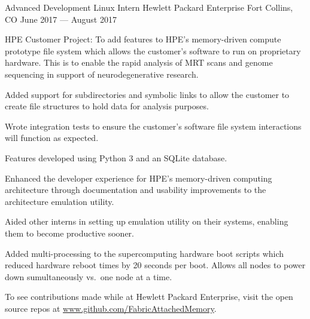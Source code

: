 

\begin{cventries}

  \cventry
    {Advanced Development Linux Intern} %
    {Hewlett Packard Enterprise} %
    {Fort Collins, CO} %
    {June 2017 --- August 2017} %
    {
      \begin{cvitems} %
        \item {HPE Customer Project:  To add features to HPE’s memory-driven compute prototype file system which allows the customer’s software to run on proprietary hardware. This is to enable the rapid analysis of MRT scans and genome sequencing in support of neurodegenerative research.}
        \item {Added support for subdirectories and symbolic links to allow the customer to create file structures to hold data for analysis purposes.}
        \item {Wrote integration tests to ensure the customer's software file system interactions will function as expected.}
        \item {Features developed using Python 3 and an SQLite database.}
        \item {Enhanced the developer experience for HPE's memory-driven computing architecture through documentation and usability improvements to the architecture emulation utility.}
        \item {Aided other interns in setting up emulation utility on their systems, enabling them to become productive sooner.}
        \item {Added multi-processing to the supercomputing hardware boot scripts which reduced hardware reboot times by 20 seconds per boot. Allows all nodes to power down sumultaneously vs.\ one node at a time.}
        \item {To see contributions made while at Hewlett Packard Enterprise, visit the open source repos at \url{www.github.com/FabricAttachedMemory}.} 
      \end{cvitems}
    }


\end{cventries}
